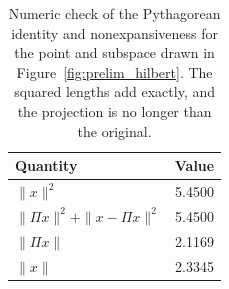 \begin{table}[h]
\centering
\caption{Numeric check of the Pythagorean identity and nonexpansiveness for the point and subspace drawn in Figure~\ref{fig:prelim_hilbert}. The squared lengths add exactly, and the projection is no longer than the original.}
\label{tab:prelim_hilbert}
\begin{tabular}{lc}
\hline
Quantity & Value \\
\hline
$\|x\|^2$ & 5.4500 \\
$\|\Pi x\|^2 + \|x - \Pi x\|^2$ & 5.4500 \\
$\|\Pi x\|$ & 2.1169 \\
$\|x\|$ & 2.3345 \\
\hline
\end{tabular}
\end{table}
